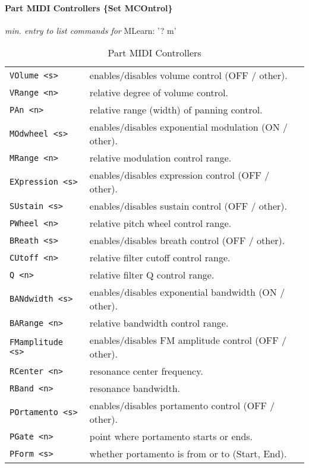 \paragraph{Part MIDI Controllers \scriptsize \{Set MCOntrol\} \normalsize}
\label{paragraph:command_line_part_midi_commands}
\textsl{min. entry to list commands for} MLearn:  '? m'
   \begin{table}[H]
      \centering
      \caption{Part MIDI Controllers}
      \label{table:yoshimi_part_midi_commands}
      \begin{tabular}{l l}
\texttt{VOlume <s>} &
   enables/disables volume control (OFF / other). \\
\texttt{VRange <n>} &
   relative degree of volume control. \\
\texttt{PAn <n>} &
   relative range (width) of panning control. \\
\texttt{MOdwheel <s>} &
   enables/disables exponential modulation (ON / other). \\
\texttt{MRange <n>} &
   relative modulation control range. \\
\texttt{EXpression <s>} &
   enables/disables expression control (OFF / other). \\
\texttt{SUstain <s>} &
   enables/disables sustain control (OFF / other). \\
\texttt{PWheel <n>} &
   relative pitch wheel control range. \\
\texttt{BReath <s>} &
   enables/disables breath control (OFF / other). \\
\texttt{CUtoff <n>} &
   relative filter cutoff control range. \\
\texttt{Q <n>} &
   relative filter Q control range. \\
\texttt{BANdwidth <s>} &
   enables/disables exponential bandwidth (ON / other). \\
\texttt{BARange <n>} &
   relative bandwidth control range. \\
\texttt{FMamplitude <s>} &
   enables/disables FM amplitude control (OFF / other). \\
\texttt{RCenter <n>} &
   resonance center frequency. \\
\texttt{RBand <n>} &
   resonance bandwidth. \\
\texttt{POrtamento <s>} &
   enables/disables portamento control (OFF / other). \\
\texttt{PGate <n>} &
   point where portamento starts or ends. \\
\texttt{PForm <s>} &
   whether portamento is from or to (Start, End). \\

\end{tabular}
\end{table}
